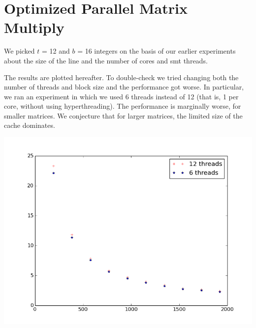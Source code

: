 \documentclass[10pt]{article}
\begin{document}
\section*{Optimized Parallel Matrix Multiply}
We picked $t$ = 12 and $b$ = 16 integers on the basis of our earlier
experiments about the size of the line and the number of cores and smt threads.

The results are plotted hereafter.  
To double-check we tried changing both the number of threads and block size and
the performance got worse. In particular, we ran an experiment in which we used
6 threads instead of 12 (that is, 1 per core, without using hyperthreading).
The performance is marginally worse, for smaller matrices. We conjecture that
for larger matrices, the limited size of the cache dominates.

\begin{center}
\includegraphics[scale=0.50]{images/matrix}
\end{center}
\end{document}

